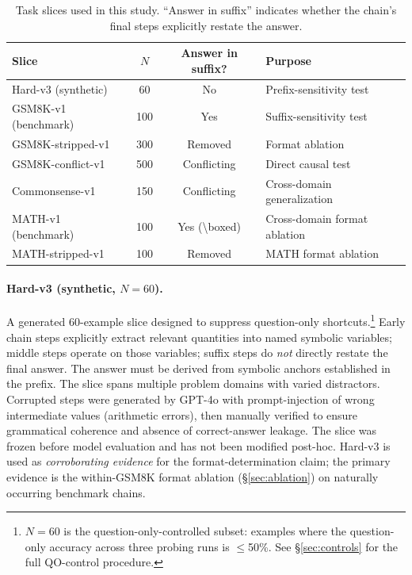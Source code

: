 \documentclass{article}
\theoremstyle{definition}
\theoremstyle{definition}
\begin{document}
\begin{table}[t]
  \centering
  \small
  \caption{Task slices used in this study. ``Answer in suffix'' indicates
  whether the chain's final steps explicitly restate the answer.}
  \label{tab:slices}
  \begin{tabular}{lccl}
    \toprule
    Slice & $N$ & Answer in suffix? & Purpose \\
    \midrule
    Hard-v3 (synthetic) & 60 & No & Prefix-sensitivity test \\
    GSM8K-v1 (benchmark) & 100 & Yes & Suffix-sensitivity test \\
    GSM8K-stripped-v1 & 300 & Removed & Format ablation \\
    GSM8K-conflict-v1 & 500 & Conflicting & Direct causal test \\
    Commonsense-v1 & 150 & Conflicting & Cross-domain generalization \\
    MATH-v1 (benchmark) & 100 & Yes (\textbackslash boxed) & Cross-domain format ablation \\
    MATH-stripped-v1 & 100 & Removed & MATH format ablation \\
    \bottomrule
  \end{tabular}
\end{table}

\paragraph{Hard-v3 (synthetic, $N{=}60$).}
A generated 60-example slice designed to suppress question-only shortcuts.\footnote{$N{=}60$ is the question-only-controlled subset: examples where the
question-only accuracy across three probing runs is $\leq$50\%. See
\S\ref{sec:controls} for the full QO-control procedure.}
Early chain steps explicitly extract relevant quantities into named symbolic
variables; middle steps operate on those variables; suffix steps do \emph{not}
directly restate the final answer. The answer must be derived from symbolic
anchors established in the prefix. The slice spans multiple problem domains
with varied distractors. Corrupted steps were generated by GPT-4o with
prompt-injection of wrong intermediate values (arithmetic errors), then
manually verified to ensure grammatical coherence and absence of correct-answer
leakage. The slice was frozen before model evaluation and has not been modified
post-hoc. Hard-v3 is used as \emph{corroborating evidence} for the
format-determination claim; the primary evidence is the within-GSM8K format
ablation (\S\ref{sec:ablation}) on naturally occurring benchmark chains.
\end{document}
